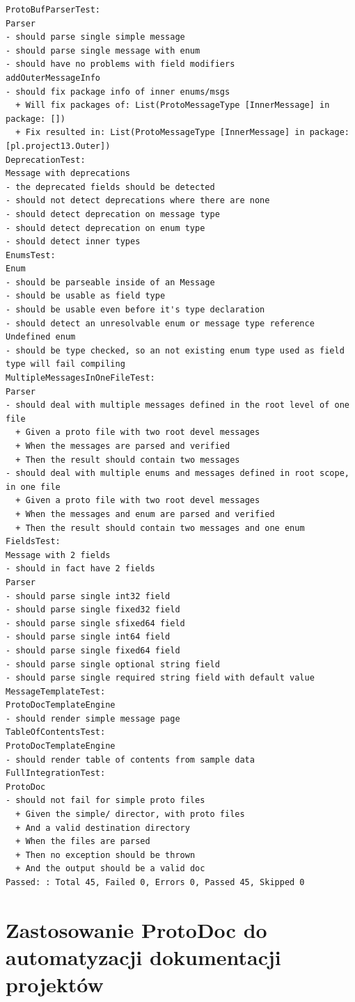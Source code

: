 \documentclass[pdflatex,11pt]{aghdpl}
\begin{document}
\begin{verbatim}
ProtoBufParserTest:
Parser 
- should parse single simple message
- should parse single message with enum
- should have no problems with field modifiers
addOuterMessageInfo 
- should fix package info of inner enums/msgs
  + Will fix packages of: List(ProtoMessageType [InnerMessage] in package: []) 
  + Fix resulted in: List(ProtoMessageType [InnerMessage] in package: [pl.project13.Outer]) 
DeprecationTest:
Message with deprecations 
- the deprecated fields should be detected
- should not detect deprecations where there are none
- should detect deprecation on message type
- should detect deprecation on enum type
- should detect inner types
EnumsTest:
Enum 
- should be parseable inside of an Message
- should be usable as field type
- should be usable even before it's type declaration
- should detect an unresolvable enum or message type reference
Undefined enum 
- should be type checked, so an not existing enum type used as field type will fail compiling
MultipleMessagesInOneFileTest:
Parser 
- should deal with multiple messages defined in the root level of one file
  + Given a proto file with two root devel messages 
  + When the messages are parsed and verified 
  + Then the result should contain two messages 
- should deal with multiple enums and messages defined in root scope, in one file
  + Given a proto file with two root devel messages 
  + When the messages and enum are parsed and verified 
  + Then the result should contain two messages and one enum 
FieldsTest:
Message with 2 fields 
- should in fact have 2 fields
Parser 
- should parse single int32 field
- should parse single fixed32 field
- should parse single sfixed64 field
- should parse single int64 field
- should parse single fixed64 field
- should parse single optional string field
- should parse single required string field with default value
MessageTemplateTest:
ProtoDocTemplateEngine 
- should render simple message page
TableOfContentsTest:
ProtoDocTemplateEngine 
- should render table of contents from sample data
FullIntegrationTest:
ProtoDoc 
- should not fail for simple proto files
  + Given the simple/ director, with proto files 
  + And a valid destination directory 
  + When the files are parsed 
  + Then no exception should be thrown 
  + And the output should be a valid doc 
Passed: : Total 45, Failed 0, Errors 0, Passed 45, Skipped 0

\end{verbatim}


\chapter{Zastosowanie ProtoDoc do automatyzacji dokumentacji projektów}
\end{document}
